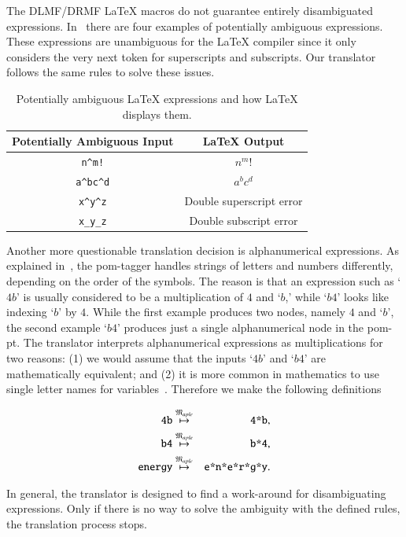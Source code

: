 \documentclass[a4paper,11pt]{article}
\newcommand{\DLMF}{DLMF}
\newcommand{\DRMF}{DRMF}
\newcommand{\Macro}{\DLMF/\DRMF{} \LaTeX{} macro}
\newcommand{\langMaple}{\mathfrak{M}_{aple}}
\theoremstyle{defTheoStyle}
\theoremstyle{defExampStyle}
\begin{document}
The \Macro s do not guarantee entirely disambiguated expressions. In~ there are four examples of potentially ambiguous expressions. These expressions are unambiguous for the \LaTeX{} compiler since it only considers the very next token for superscripts and subscripts. Our translator follows the same rules to solve these issues.

\begin{table}[ht]
\centering
\begin{tabular}{cc}
	\hline
	Potentially Ambiguous Input & \LaTeX{} Output\\
	\hline
	\verb|n^m!| & $n^m!$\\
	\verb|a^bc^d| & $a^bc^d$\\
	\verb|x^y^z| & Double superscript error\\
	\verb|x_y_z| & Double subscript error\\
	\hline
\end{tabular}
\caption{Potentially ambiguous \LaTeX{} expressions and how \LaTeX{} displays them.}
\label{tab:amb-latex}
\end{table}

Another more questionable translation decision is alphanumerical expressions. As explained in~, the \gls*{pom}-tagger handles strings of letters and numbers differently, depending on the order of the symbols. The reason is that an expression such as `$4b$' is usually considered to be a multiplication of $4$ and `$b$,' while `$b4$' looks like indexing `$b$' by $4$. While the first example produces two nodes, namely $4$ and `$b$', the second example `$b4$' produces just a single alphanumerical node in the \gls*{pom-pt}. The translator interprets alphanumerical expressions as multiplications for two reasons: (1) we would assume that the inputs `$4b$' and `$b4$' are mathematically equivalent; and (2) it is more common in mathematics to use single letter names for variables~\parencite{Notation:History}. Therefore we make the following definitions

\begin{eqnarray*}
\verb|4b| & \overset{\langMaple}{\mapsto} & \verb|4*b|,\\
\verb|b4| & \overset{\langMaple}{\mapsto} & \verb|b*4|,\\
\verb|energy| & \overset{\langMaple}{\mapsto} & \verb|e*n*e*r*g*y|.
\end{eqnarray*}

In general, the translator is designed to find a work-around for disambiguating expressions. Only if there is no way to solve the ambiguity with the defined rules, the translation process stops.
\end{document}
